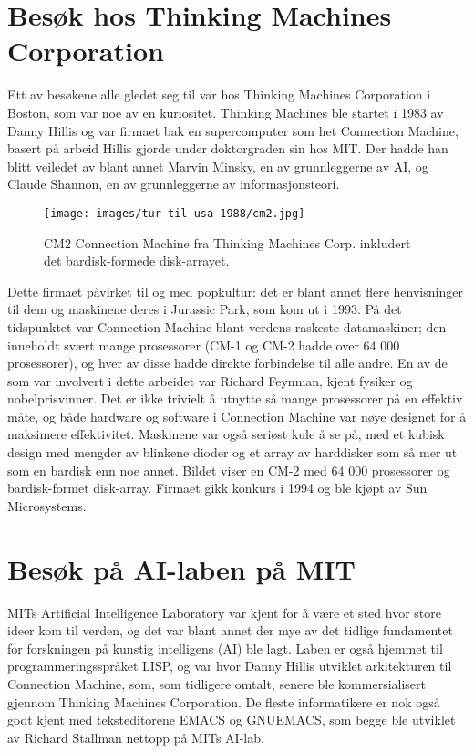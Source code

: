 \section{Besøk hos Thinking Machines Corporation}

Ett av besøkene alle gledet seg til var hos Thinking Machines Corporation i Boston, som var noe av en kuriositet. Thinking Machines ble startet i 1983 av Danny Hillis og var firmaet bak en supercomputer som het Connection Machine, basert på arbeid Hillis gjorde under doktorgraden sin hos MIT. Der hadde han blitt veiledet av blant annet Marvin Minsky, en av grunnleggerne av AI, og Claude Shannon, en av grunnleggerne av informasjonsteori. 

\begin{figure}
	\texttt{[image: images/tur-til-usa-1988/cm2.jpg]}
	\caption{CM2 Connection Machine fra Thinking Machines Corp. inkludert det bardisk-formede disk-arrayet.}
\end{figure}

Dette firmaet påvirket til og med popkultur: det er blant annet flere henvisninger til dem og maskinene deres i Jurassic Park, som kom ut i 1993. På det tidspunktet var Connection Machine blant verdens raskeste datamaskiner; den inneholdt svært mange prosessorer (CM-1 og CM-2 hadde over 64 000 prosessorer), og hver av disse hadde direkte forbindelse til alle andre. En av de som var involvert i dette arbeidet var Richard Feynman, kjent fysiker og nobelprisvinner. Det er ikke trivielt å utnytte så mange prosessorer på en effektiv måte, og både hardware og software i Connection Machine var nøye designet for å maksimere effektivitet. Maskinene var også seriøst kule å se på, med et kubisk design med mengder av blinkene dioder og et array av harddisker som så mer ut som en bardisk enn noe annet. Bildet viser en CM-2 med 64 000 prosessorer og bardisk-formet disk-array. Firmaet gikk konkurs i 1994 og ble kjøpt av Sun Microsystems. 

\section{Besøk på AI-laben på MIT}

MITs Artificial Intelligence Laboratory var kjent for å være et sted hvor store ideer kom til verden, og det var blant annet der mye av det tidlige fundamentet for forskningen på kunstig intelligens (AI) ble lagt. Laben er også hjemmet til programmeringsspråket LISP, og var hvor Danny Hillis utviklet arkitekturen til Connection Machine, som, som tidligere omtalt, senere ble kommersialisert gjennom Thinking Machines Corporation. De fleste informatikere er nok også godt kjent med teksteditorene EMACS og GNUEMACS, som begge ble utviklet av Richard Stallman nettopp på MITs AI-lab. 

